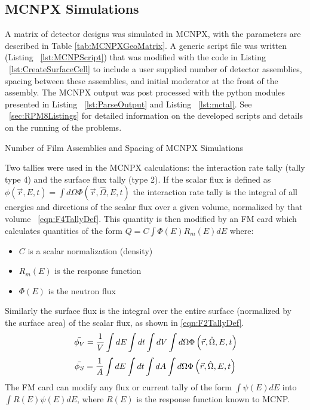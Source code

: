 \subsection{MCNPX Simulations}
\label{sec:MCNPXMethods}
A matrix of detector designs was simulated in MCNPX, with the parameters are described in Table \ref{tab:MCNPXGeoMatrix}.
A generic script file was written (Listing ~\ref{lst:MCNPScript}) that was modified with the code in Listing ~\ref{lst:CreateSurfaceCell} to include a user supplied number of detector assemblies, spacing between these assemblies, and initial moderator at the front of the assembly.
The MCNPX output was post processed with the python modules presented in Listing ~\ref{lst:ParseOutput} and Listing ~\ref{lst:mctal}.
See ~\ref{sec:RPM8Listings} for detailed information on the developed scripts and details on the running of the problems.
\begin{table}
	\caption{Number of Film Assemblies and Spacing of MCNPX Simulations}
	\label{tab:MCNPXGeoMatrix}
  \centering
	
\end{table}

Two tallies were used in the MCNPX calculations: the interaction rate tally (tally type 4) and the surface flux tally (type 2).
If the scalar flux is defined as $\phi(\vec{r},E,t)=\int d\Omega \Phi(\vec{r},\hat{\Omega},E,t)$ the  interaction rate tally is the integral of all energies and directions of the scalar flux over a given volume, normalized by that volume ~\eqref{eqn:F4TallyDef}.
This quantity is then modified by an FM card which calculates quantities of the form $Q = C \int {\Phi(E) R_m(E) dE }$ where:
\begin{itemize}
    \item $C$ is a scalar normalization (density)
    \item $R_m(E)$ is the response function
    \item $\Phi(E)$ is the neutron flux
\end{itemize}
Similarly the surface flux is the integral over the entire surface (normalized by the surface area) of the scalar flux, as shown in \eqref{eqn:F2TallyDef}.
\begin{align}
    \label{eqn:F4TallyDef}
    \bar{\phi_V} = \frac{1}{V}\int dE \int dt \int dV \int d\Omega \Phi \left ( \vec{r},\hat{\Omega},E,t \right )
\end{align}
\begin{align}
    \label{eqn:F2TallyDef}
    \bar{\phi_S} = \frac{1}{A}\int dE \int dt \int dA \int d\Omega \Phi \left ( \vec{r},\hat{\Omega},E,t \right )
\end{align}
The FM card can modify any flux or current tally of the form $\int \psi (E) dE$ into $\int R(E)\psi(E) dE$, where $R(E)$ is the response function known to MCNP.
